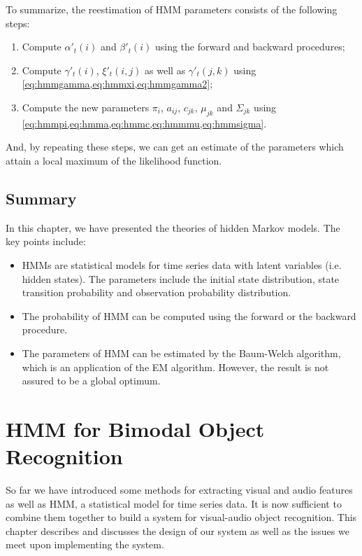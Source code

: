 \documentclass[12pt,final,twoside]{report}
\theoremstyle{plain}
\theoremstyle{definition}
\theoremstyle{remark}
\begin{document}
To summarize, the reestimation of HMM parameters consists of the following steps:
\begin{enumerate}
  \item Compute $\alpha'_t(i)$ and $\beta'_t(i)$ using the forward and backward procedures;
  \item Compute $\gamma'_t(i)$, $\xi'_t(i,j)$ as well as $\gamma'_t(j,k)$ using \cref{eq:hmmgamma,eq:hmmxi,eq:hmmgamma2};
  \item Compute the new parameters $\pi_i$, $a_{ij}$, $c_{jk}$, $\mu_{jk}$ and $\Sigma_{jk}$ using \cref{eq:hmmpi,eq:hmma,eq:hmmc,eq:hmmmu,eq:hmmsigma}.
\end{enumerate}
And, by repeating these steps, we can get an estimate of the parameters which attain a local maximum of the likelihood function.

\section{Summary}
In this chapter, we have presented the theories of hidden Markov models. The key points include:
\begin{itemize}
  \item HMMs are statistical models for time series data with latent variables (i.e. hidden states). The parameters include the initial state distribution, state transition probability and observation probability distribution.
  \item The probability of HMM can be computed using the forward or the backward procedure.
  \item The parameters of HMM can be estimated by the Baum-Welch algorithm, which is an application of the EM algorithm. However, the result is not assured to be a global optimum.
\end{itemize}

\cleardoublepage
\chapter{HMM for Bimodal Object Recognition}
So far we have introduced some methods for extracting visual and audio features as well as HMM, a statistical model for time series data. It is now sufficient to combine them together to build a system for visual-audio object recognition. This chapter describes and discusses the design of our system as well as the issues we meet upon implementing the system. 
\end{document}
